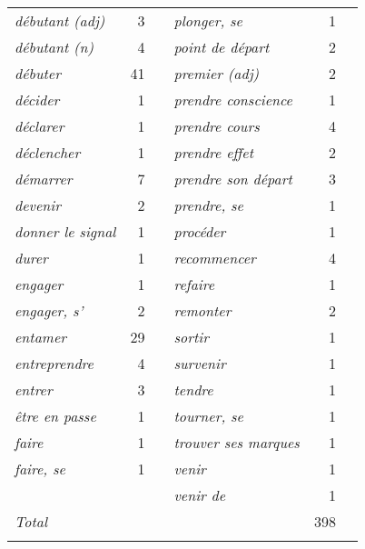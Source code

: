 \begin{table}
\begin{tabularx}{\textwidth}{>{\itshape}lrX>{\itshape}lrr}
débutant (adj) &  3                       & & plonger, se &  1\\
débutant (n) &  4                         & & point de départ &  2\\
débuter &  41                             & & premier (adj) &  2\\
décider &  1                              & & prendre conscience &  1\\
déclarer &  1                             & & prendre cours &  4\\
déclencher &  1                           & & prendre effet &  2\\
démarrer &  7                             & & prendre son départ &  3\\
devenir &  2                              & & prendre, se &  1\\
donner le signal &  1                     & & procéder &  1\\
durer &  1                                & & recommencer &  4\\
engager &  1                              & & refaire &  1\\
engager, s' &  2                          & & remonter &  2\\
entamer &  29                             & & sortir &  1\\
entreprendre &  4                         & & survenir &  1\\
entrer &  3                               & & tendre &  1\\
être en passe &  1                        & & tourner, se &  1\\
faire &  1                                & & trouver ses marques &  1\\
faire, se &  1                            & & venir &  1\\
          &                               & & venir de &  1\\                                 
\midrule 
\normalfont Total & & & & 398\\
\lspbottomrule
\end{tabularx}
\end{table}

